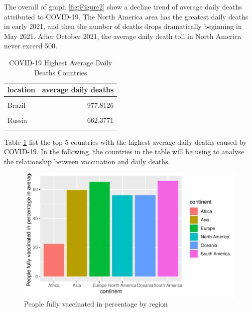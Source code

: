 \documentclass[11pt,a4paper,]{article}
\begin{document}
The overall of graph \ref{fig:Figure2} show a decline trend of average daily deaths attributed to COVID-19. The North America area has the greatest daily deaths in early 2021, and then the number of deaths drops dramatically beginning in May 2021. After October 2021, the average daily death toll in North America never exceed 500.

\begin{table}[!h]

\caption{\label{tab:Table2}COVID-19 Highest Average Daily Deaths Countries}
\centering
\begin{tabular}[t]{l|r}
\hline
location & average daily deaths\\
\hline
\cellcolor{gray!6}{United States} & \cellcolor{gray!6}{1200.9892}\\
\hline
Brazil & 977.8126\\
\hline
\cellcolor{gray!6}{India} & \cellcolor{gray!6}{797.7945}\\
\hline
Russia & 662.3771\\
\hline
\cellcolor{gray!6}{Mexico} & \cellcolor{gray!6}{396.0946}\\
\hline
\end{tabular}
\end{table}

Table \ref{tab:Table2} list the top 5 countries with the highest average daily deaths caused by COVID-19.
In the following, the countries in the table will be using to analyse the relationship between vaccination and daily deaths.

\clearpage

\begin{figure}

{\centering \includegraphics{report_files/figure-latex/Figure3-1} 

}

\caption{People fully vaccinated in percentage by region}\label{fig:Figure3}
\end{figure}
\end{document}
